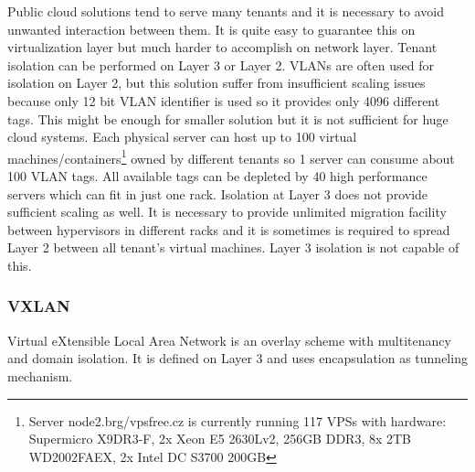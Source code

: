 Public cloud solutions tend to serve many tenants and it is necessary to avoid unwanted interaction between them. It is quite easy to guarantee this on virtualization layer but much harder to accomplish on network layer. Tenant isolation can be performed on Layer 3 or Layer 2. \Ac{VLAN}s are often used for isolation on Layer 2, but this solution suffer from insufficient scaling issues because only 12 bit \Ac{VLAN} identifier is used so it provides only 4096 different tags. This might be enough for smaller solution but it is not sufficient for huge cloud systems. Each physical server can host up to 100 virtual machines/containers\footnote{Server node2.brg/vpsfree.cz is currently running 117 \Ac{VPS}s with hardware: Supermicro \mbox{X9DR3-F}, 2x Xeon E5 2630Lv2, 256GB DDR3, 8x 2TB WD2002FAEX, 2x Intel DC S3700 200GB} owned by different tenants so 1 server can consume about 100 \Ac{VLAN} tags. All available tags can be depleted by 40 high performance servers which can fit in just one rack. Isolation at Layer 3 does not provide sufficient scaling as well. It is necessary to provide unlimited migration facility between hypervisors in different racks and it is sometimes is required to spread Layer 2 between all tenant's virtual machines. Layer 3 isolation is not capable of this.



\subsubsection{VXLAN}
Virtual eXtensible Local Area Network is an overlay scheme with multitenancy and domain isolation. It is defined on Layer 3 and uses encapsulation as tunneling mechanism.

